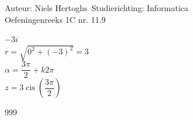 \documentclass[a4paper]{article}
\begin{document}
  
\noindent \large Auteur: Niels Hertoghs\
\noindent \large Studierichting: Informatica\\
\noindent \large Oefeningenreeks 1C nr. 11.9\\

\medskip

\normalsize

$-3i$\\

$r = \sqrt{0^2 + (-3)^2} = 3$\\

$\alpha = \dfrac{3\pi}{2} + k2\pi$\\

$z = 3\operatorname{cis}\left(\dfrac{3\pi}{2}\right)$\\



\begin{thebibliography}{999}
\end{thebibliography}
\end{document}
